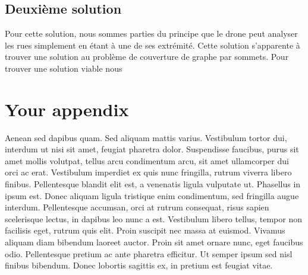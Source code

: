 \documentclass[12pt, twoside]{report}
\begin{document}
\section{Deuxième solution}


Pour cette solution, nous sommes parties du principe que le drone peut analyser
les rues simplement en étant à une de ses extrémité. Cette solution s'apparente
à trouver une solution au problème de couverture de graphe par sommets. Pour
trouver une solution viable nous 
  


\appendix
\chapter{Your appendix}\label{apx:morestuff}
Aenean sed dapibus quam. 
Sed aliquam mattis varius. 
Vestibulum tortor dui, interdum ut nisi sit amet, feugiat pharetra dolor. 
Suspendisse faucibus, purus sit amet mollis volutpat, tellus arcu condimentum arcu, sit amet ullamcorper dui orci ac erat. 
Vestibulum imperdiet ex quis nunc fringilla, rutrum viverra libero finibus. 
Pellentesque blandit elit est, a venenatis ligula vulputate ut. 
Phasellus in ipsum est. Donec aliquam ligula tristique enim condimentum, sed fringilla augue interdum. 
Pellentesque accumsan, orci at rutrum consequat, risus sapien scelerisque lectus, in dapibus leo nunc a est. Vestibulum libero tellus, tempor non facilisis eget, rutrum quis elit.
Proin suscipit nec massa at euismod. Vivamus aliquam diam bibendum laoreet auctor.
Proin sit amet ornare nunc, eget faucibus odio. 
Pellentesque pretium ac ante pharetra efficitur. 
Ut semper ipsum sed nisl finibus bibendum. Donec lobortis sagittis ex, in pretium est feugiat vitae. 
\end{document}

